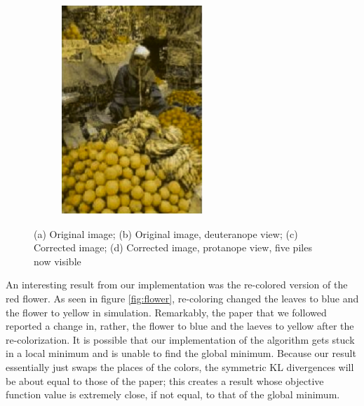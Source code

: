 \documentclass[10pt,twocolumn,letterpaper]{article}
\begin{document}
\begin{figure}[h]
\begin{subfigure}{0.23\textwidth}
    \includegraphics[width=\textwidth]{fruits4.png}
    \caption{}
  \end{subfigure}
  \caption{(a) Original image; (b) Original image, deuteranope view; (c) Corrected image; (d) Corrected image, protanope view, five piles now visible}
  \label{fig:fruits}
\end{figure}

An interesting result from our implementation was the re-colored version of the red flower. As seen in figure \ref{fig:flower}, re-coloring changed the leaves to blue and the flower to yellow in simulation. Remarkably, the paper that we followed reported a change in, rather, the flower to blue and the laeves to yellow after the re-colorization. It is possible that our implementation of the algorithm gets stuck in a local minimum and is unable to find the global minimum. Because our result essentially just swaps the places of the colors, the symmetric KL divergences will be about equal to those of the paper; this creates a result whose objective function value is extremely close, if not equal, to that of the global minimum. 
\end{document}
